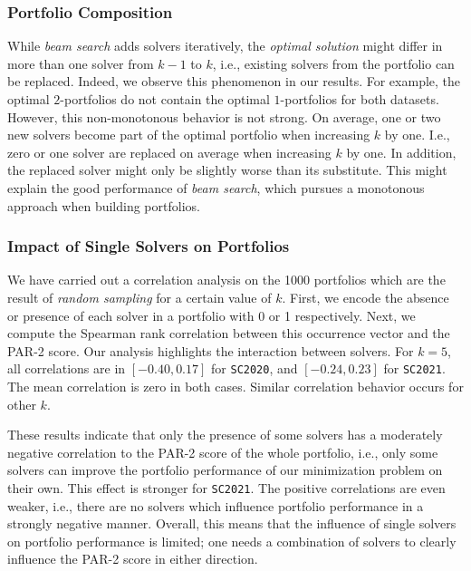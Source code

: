 \documentclass[runningheads]{llncs}
\begin{document}
\subsubsection{Portfolio Composition}

While \emph{beam search} adds solvers iteratively, the \emph{optimal solution} might differ in more than one solver from $k-1$ to $k$, i.e., existing solvers from the portfolio can be replaced.
Indeed, we observe this phenomenon in our results.
For example, the optimal $2$-portfolios do not contain the optimal $1$-portfolios for both datasets.
However, this non-monotonous behavior is not strong.
On average, one or two new solvers become part of the optimal portfolio when increasing $k$ by one.
I.e., zero or one solver are replaced on average when increasing $k$ by one.
In addition, the replaced solver might only be slightly worse than its substitute.
This might explain the good performance of \emph{beam search}, which pursues a monotonous approach when building portfolios.

\subsubsection{Impact of Single Solvers on Portfolios}

We have carried out a correlation analysis on the 1000 portfolios which are the result of \emph{random sampling} for a certain value of $k$. 
First, we encode the absence or presence of each solver in a portfolio with 0 or 1 respectively.
Next, we compute the Spearman rank correlation between this occurrence vector and the PAR-2 score.
Our analysis highlights the interaction between solvers. 
For $k=5$, all correlations are in $[-0.40,0.17]$ for \texttt{SC2020}, and $[-0.24,0.23]$ for \texttt{SC2021}.
The mean correlation is zero in both cases.
Similar correlation behavior occurs for other $k$.

These results indicate that only the presence of some solvers has a moderately negative correlation to the PAR-2 score of the whole portfolio, i.e., only some solvers can improve the portfolio performance of our minimization problem on their own.
This effect is stronger for \texttt{SC2021}.
The positive correlations are even weaker, i.e., there are no solvers which influence portfolio performance in a strongly negative manner.
Overall, this means that the influence of single solvers on portfolio performance is limited; one needs a combination of solvers to clearly influence the PAR-2 score in either direction.
\end{document}
